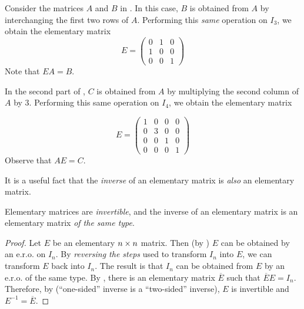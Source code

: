 \begin{example} \label{example 3.1.2}
Consider the matrices \(A\) and \(B\) in .
In this case, \(B\) is obtained from \(A\) by interchanging the first two rows of \(A\).
Performing this \emph{same} operation on \(I_{3}\), we obtain the elementary matrix
\[
    E = \begin{pmatrix}
        0 & 1 & 0 \\
        1 & 0 & 0 \\
        0 & 0 & 1
    \end{pmatrix}
\]
Note that \(EA = B\).

In the second part of , \(C\) is obtained from \(A\) by multiplying the second column of \(A\) by \(3\).
Performing this same operation on \(I_{4}\), we obtain the elementary matrix

\[
    E = \begin{pmatrix}
        1 & 0 & 0 & 0 \\
        0 & 3 & 0 & 0 \\
        0 & 0 & 1 & 0 \\
        0 & 0 & 0 & 1
    \end{pmatrix}
\]
Observe that \(AE = C\).
\end{example}

It is a useful fact that the \emph{inverse} of an elementary matrix is \emph{also} an elementary matrix.

\begin{theorem} \label{theorem} \label{thm 3.2}
Elementary matrices are \emph{invertible}, and the inverse of an elementary matrix is an elementary matrix \emph{of the same type}.
\end{theorem}

\begin{proof}
Let \(E\) be an elementary \(n \times n\) matrix.
Then (by ) \(E\) can be obtained by an e.r.o. on \(I_n\).
By \emph{reversing the steps} used to transform \(I_n\) into \(E\), we can transform \(E\) back into \(I_n\).
The result is that \(I_n\) can be obtained from \(E\) by an e.r.o. of the same type.
By , there is an elementary matrix \(\overline{E}\) such that \(\overline{E}E = I_n\).
Therefore, by (``one-sided'' inverse is a ``two-sided'' inverse), \(E\) is invertible and \(E^{-1} = \overline{E}\).
\end{proof}

\exercisesection


